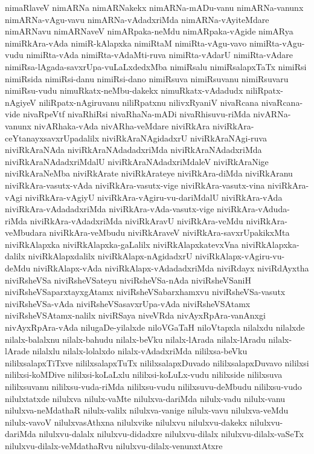 {nimaRlaveV
nimARNa
nimARNakekx
nimARNa-mADu-vanu
nimARNa-vanunx
nimARNa-vAgu-vavu
nimARNa-vAdadxriMda
nimARNa-vAyiteMdare
nimARNavu
nimARNaveV
nimARpaka-neMdu
nimARpaka-vAgide
nimARya
nimiRkAra-vAda
nimiR-kAlapxka
nimiRtaM
nimiRta-vAgu-vavo
nimiRta-vAgu-vudu
nimiRta-vAda
nimiRta-vAdaMti-ruva
nimiRta-vAdarU
nimiRta-vAdare
nimiRsa-lAgada-savxrUpa-vuLaLxdedxMba
nimiRsalu
nimiRsalapxTaTx
nimiRsi
nimiRsida
nimiRsi-danu
nimiRsi-dano
nimiRsuva
nimiRsuvanu
nimiRsuvaru
nimiRsu-vudu
nimuRkatx-neMbu-dakekx
nimuRkatx-vAdadudx
niliRpatx-nAgiyeV
niliRpatx-nAgiruvanu
niliRpatxnu
nilivxRyaniV
nivaRcana
nivaRcana-vide
nivaRpeVtf
nivaRhiRsi
nivaRhaNa-mADi
nivaRhisuvu-riMda
nivARNa-vanunx
nivARhaka-vAda
nivARha-veMdare
niviRkAra
niviRkAra-ceYtanayxsavxrUpadalilx
niviRkAraNAgidadxrU
niviRkAraNAgi-ruva
niviRkAraNAda
niviRkAraNAdadadxriMda
niviRkAraNAdadxriMda
niviRkAraNAdadxriMdalU
niviRkAraNAdadxriMdaleV
niviRkAraNige
niviRkAraNeMba
niviRkArate
niviRkArateye
niviRkAra-diMda
niviRkAranu
niviRkAra-vasutx-vAda
niviRkAra-vasutx-vige
niviRkAra-vasutx-vina
niviRkAra-vAgi
niviRkAra-vAgiyU
niviRkAra-vAgiru-vu-dariMdalU
niviRkAra-vAda
niviRkAra-vAdadadxriMda
niviRkAra-vAda-vasutx-vige
niviRkAra-vAduda-riMda
niviRkAra-vAdadxriMda
niviRkAravU
niviRkAra-veMdu
niviRkAra-veMbudara
niviRkAra-veMbudu
niviRkAraveV
niviRkAra-savxrUpakikxMta
niviRkAlapxka
niviRkAlapxka-gaLalilx
niviRkAlapxkatevxVna
niviRkAlapxka-dalilx
niviRkAlapxdalilx
niviRkAlapx-nAgidadxrU
niviRkAlapx-vAgiru-vu-deMdu
niviRkAlapx-vAda
niviRkAlapx-vAdadadxriMda
niviRdayx
niviRdAyxtha
niviRsheVSa
niviRsheVSateyu
niviRsheVSa-nAda
niviRsheVSaniH
niviRsheVSaparxtayxgAtamx
niviRsheVSabarxhamxvu
niviRsheVSa-vasutx
niviRsheVSa-vAda
niviRsheVSasavxrUpa-vAda
niviRsheVSAtamx
niviRsheVSAtamx-nalilx
niviRSaya
niveVRda
nivAyxRpAra-vanAnxgi
nivAyxRpAra-vAda
nilugaDe-yilalxde
niloVGaTaH
niloVtapxla
nilalxdu
nilalxde
nilalx-balalxnu
nilalx-bahudu
nilalx-beVku
nilalx-lArada
nilalx-lAradu
nilalx-lArade
nilalxlu
nilalx-lolalxdo
nilalx-vAdadxriMda
nililxsa-beVku
nililxsalapxTiTxve
nililxsalapxTuTx
nililxsalapxDuvado
nililxsalapxDuvavo
nililxsi
nililxsi-koMDive
nililxsi-koLaLxlu
nililxsi-koLuLx-vudu
nililxside
nililxsuva
nililxsuvanu
nililxsu-vuda-riMda
nililxsu-vudu
nililxsuvu-deMbudu
nililxsu-vudo
nilulxtatxde
nilulxva
nilulx-vaMte
nilulxva-dariMda
nilulx-vadu
nilulx-vanu
nilulxva-neMdathaR
nilulx-valilx
nilulxva-vanige
nilulx-vavu
nilulxva-veMdu
nilulx-vavoV
nilulxvasAthxna
nilulxvike
nilulxvu
nilulxvu-dakekx
nilulxvu-dariMda
nilulxvu-dalalx
nilulxvu-didadxre
nilulxvu-dilalx
nilulxvu-dilalx-vaSeTx
nilulxvu-dilalx-veMdathaRvu
nilulxvu-dilalx-venunxtAtxre
}
